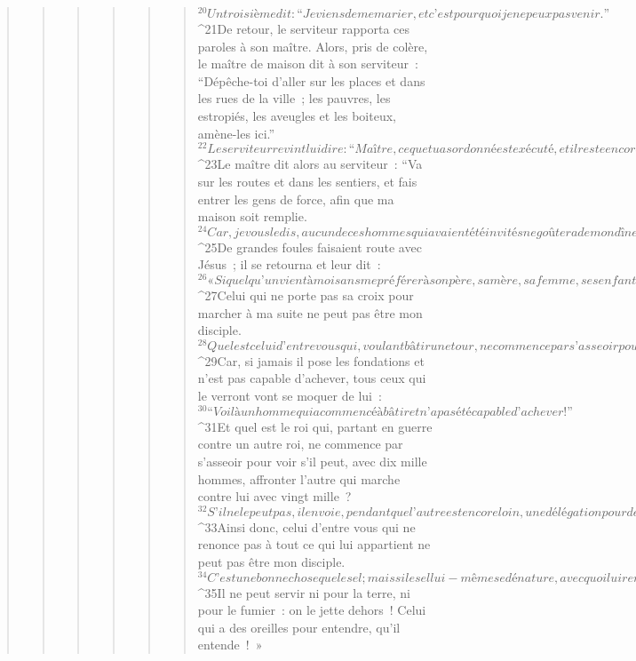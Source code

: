\begin{verse}
\begin{verse}
\begin{verse}
\begin{verse}
\begin{verse}
\begin{verse}
${}^{20}Un troisième dit : “Je viens de me marier, et c’est pourquoi je ne peux pas venir.” 
${}^{21}De retour, le serviteur rapporta ces paroles à son maître. Alors, pris de colère, le maître de maison dit à son serviteur : “Dépêche-toi d’aller sur les places et dans les rues de la ville ; les pauvres, les estropiés, les aveugles et les boiteux, amène-les ici.” 
${}^{22}Le serviteur revint lui dire : “Maître, ce que tu as ordonné est exécuté, et il reste encore de la place.” 
${}^{23}Le maître dit alors au serviteur : “Va sur les routes et dans les sentiers, et fais entrer les gens de force, afin que ma maison soit remplie. 
${}^{24}Car, je vous le dis, aucun de ces hommes qui avaient été invités ne goûtera de mon dîner.” »
${}^{25}De grandes foules faisaient route avec Jésus ; il se retourna et leur dit : 
${}^{26}« Si quelqu’un vient à moi sans me préférer à son père, sa mère, sa femme, ses enfants, ses frères et sœurs, et même à sa propre vie, il ne peut pas être mon disciple. 
${}^{27}Celui qui ne porte pas sa croix pour marcher à ma suite ne peut pas être mon disciple.
${}^{28}Quel est celui d’entre vous qui, voulant bâtir une tour, ne commence par s’asseoir pour calculer la dépense et voir s’il a de quoi aller jusqu’au bout ? 
${}^{29}Car, si jamais il pose les fondations et n’est pas capable d’achever, tous ceux qui le verront vont se moquer de lui : 
${}^{30}“Voilà un homme qui a commencé à bâtir et n’a pas été capable d’achever !” 
${}^{31}Et quel est le roi qui, partant en guerre contre un autre roi, ne commence par s’asseoir pour voir s’il peut, avec dix mille hommes, affronter l’autre qui marche contre lui avec vingt mille ? 
${}^{32}S’il ne le peut pas, il envoie, pendant que l’autre est encore loin, une délégation pour demander les conditions de paix. 
${}^{33}Ainsi donc, celui d’entre vous qui ne renonce pas à tout ce qui lui appartient ne peut pas être mon disciple.
${}^{34}C’est une bonne chose que le sel ; mais si le sel lui-même se dénature, avec quoi lui rendra-t-on sa saveur ? 
${}^{35}Il ne peut servir ni pour la terre, ni pour le fumier : on le jette dehors ! Celui qui a des oreilles pour entendre, qu’il entende ! »
      

\end{verse}
\end{verse}
\end{verse}
\end{verse}
\end{verse}
\end{verse}
